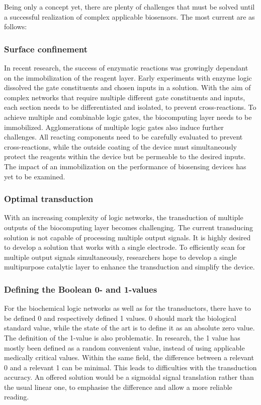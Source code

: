 \documentclass[runningheads]{llncs}
\begin{document}
Being only a concept yet, there are plenty of challenges that must be solved until a successful realization of complex applicable biosensors. The most current are as follows:

\subsubsection{Surface confinement}	In recent research, the success of enzymatic reactions was growingly dependant on the immobilization of the reagent layer. Early experiments with enzyme logic dissolved the gate constituents and chosen inputs in a solution. With the aim of complex networks that require multiple different gate constituents and inputs, each section needs to be differentiated and isolated, to prevent cross-reactions. To achieve multiple and combinable logic gates, the biocomputing layer needs to be immobilized. Agglomerations of multiple logic gates also induce further challenges. All reacting components need to be carefully evaluated to prevent cross-reactions, while the outside coating of the device must simultaneously protect the reagents within the device but be permeable to the desired inputs. The impact of an immobilization on the performance of biosensing devices has yet to be examined.\cite{original}

\subsubsection{Optimal transduction} With an increasing complexity of logic networks, the transduction of multiple outputs of the biocomputing layer becomes challenging. The current transducing solution is not capable of processing multiple output signals. It is highly desired to develop a solution that works with a single electrode. To efficiently scan for multiple output signals simultaneously, researchers hope to develop a single multipurpose catalytic layer to enhance the transduction and simplify the device. \cite{original}

\subsubsection{Defining the Boolean 0- and 1-values} For the biochemical logic networks as well as for the transductors, there have to be defined 0 and respectively defined 1 values. 0 should mark the biological standard value, while the state of the art is to define it as an absolute zero value. The definition of the 1-value is also problematic. In research, the 1 value has mostly been defined as a random convenient value, instead of using applicable medically critical values. Within the same field, the difference between a relevant 0 and a relevant 1 can be minimal. This leads to difficulties with the transduction accuracy. An offered solution would be a sigmoidal signal translation rather than the usual linear one, to emphasise the difference and allow a more reliable reading.\cite{original}
\end{document}
